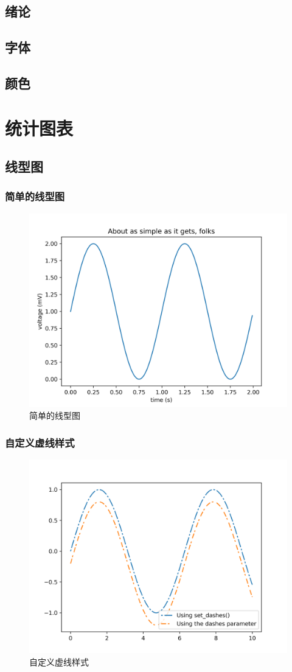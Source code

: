 \documentclass[openany]{progbookcn}
\begin{document}
\section{绪论}
\section{字体}
\section{颜色}
\chapter{统计图表}
\section{线型图}
\subsection{简单的线型图}

\begin{figure}[H]
\centering
\includegraphics[width=0.6 \textwidth]{figs/chapter24/lines/SimpleLine}
\caption{简单的线型图}
\end{figure}

\subsection{自定义虚线样式}

\begin{figure}[H]
\centering
\includegraphics[width=0.6 \textwidth]{figs/chapter24/lines/CustomizeLineStyle}
\caption{自定义虚线样式}
\end{figure}
\end{document}

